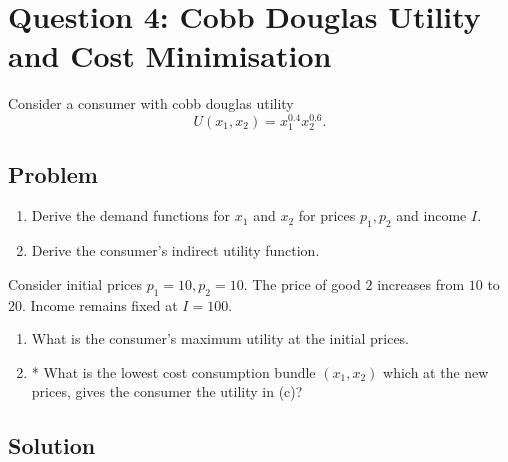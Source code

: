 \documentclass[12pt]{article}
\begin{document}
\newpage
\newpage
\section{Question 4: Cobb Douglas Utility and Cost Minimisation}

\noindent
Consider a consumer with cobb douglas utility
\[
U(x_1,x_2)=x_1^{0.4}x_2^{0.6}.
\]

\subsection{Problem}
\begin{enumerate}[label=(\alph*)]
    \item Derive the demand functions for \(x_1\) and \(x_2\) for prices \(p_1,p_2\) and income \(I\).
    \item Derive the consumer’s indirect utility function.
\end{enumerate}

\noindent
Consider initial prices \(p_1=10,p_2=10\). The price of good \(2\) increases from \(10\) to \(20\). Income remains fixed at \(I=100\).

\begin{enumerate}[label=(\alph*),start=3]
    \item What is the consumer’s maximum utility at the initial prices.
    \item * What is the lowest cost consumption bundle \((x_1,x_2)\) which at the new prices, gives the consumer the utility in (c)?
\end{enumerate}

\subsection{Solution}
\end{document}
